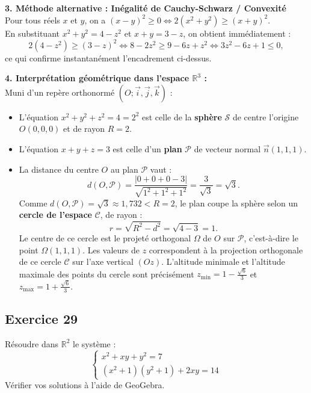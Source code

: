 \documentclass[11pt,a4paper]{article}
\begin{document}
\begin{correctionbox}
\textbf{3. Méthode alternative : Inégalité de Cauchy-Schwarz / Convexité}\\
Pour tous réels $x$ et $y$, on a $(x - y)^2 \ge 0 \iff 2(x^2 + y^2) \ge (x + y)^2$.\\
En substituant $x^2 + y^2 = 4 - z^2$ et $x + y = 3 - z$, on obtient immédiatement :
\[
2(4 - z^2) \ge (3 - z)^2 \iff 8 - 2z^2 \ge 9 - 6z + z^2 \iff 3z^2 - 6z + 1 \le 0,
\]
ce qui confirme instantanément l'encadrement ci-dessus.

\textbf{4. Interprétation géométrique dans l'espace $\mathbb{R}^3$ :}\\
Muni d'un repère orthonormé $(O; \vec{i}, \vec{j}, \vec{k})$ :
\begin{itemize}[leftmargin=*,label=\textbullet]
    \item L'équation $x^2 + y^2 + z^2 = 4 = 2^2$ est celle de la \textbf{sphère} $\mathcal{S}$ de centre l'origine $O(0,0,0)$ et de rayon $R = 2$.
    \item L'équation $x + y + z = 3$ est celle d'un \textbf{plan} $\mathcal{P}$ de vecteur normal $\vec{n}(1, 1, 1)$.
    \item La distance du centre $O$ au plan $\mathcal{P}$ vaut :
    \[
    d(O, \mathcal{P}) = \frac{|0 + 0 + 0 - 3|}{\sqrt{1^2 + 1^2 + 1^2}} = \frac{3}{\sqrt{3}} = \sqrt{3}.
    \]
    Comme $d(O, \mathcal{P}) = \sqrt{3} \approx 1{,}732 < R = 2$, le plan coupe la sphère selon un \textbf{cercle de l'espace} $\mathcal{C}$, de rayon :
    \[
    r = \sqrt{R^2 - d^2} = \sqrt{4 - 3} = 1.
    \]
    Le centre de ce cercle est le projeté orthogonal $\Omega$ de $O$ sur $\mathcal{P}$, c'est-à-dire le point $\Omega(1, 1, 1)$.
    Les valeurs de $z$ correspondent à la projection orthogonale de ce cercle $\mathcal{C}$ sur l'axe vertical $(Oz)$. L'altitude minimale et l'altitude maximale des points du cercle sont précisément $z_{\min} = 1 - \frac{\sqrt{6}}{3}$ et $z_{\max} = 1 + \frac{\sqrt{6}}{3}$.
\end{itemize}
\end{correctionbox}

\subsection*{Exercice 29}
Résoudre dans $\mathbb{R}^2$ le système :
\[
\begin{cases}
x^2 + xy + y^2 = 7 \\
(x^2 + 1)(y^2 + 1) + 2xy = 14
\end{cases}
\]
Vérifier vos solutions à l'aide de GeoGebra.
\end{document}
